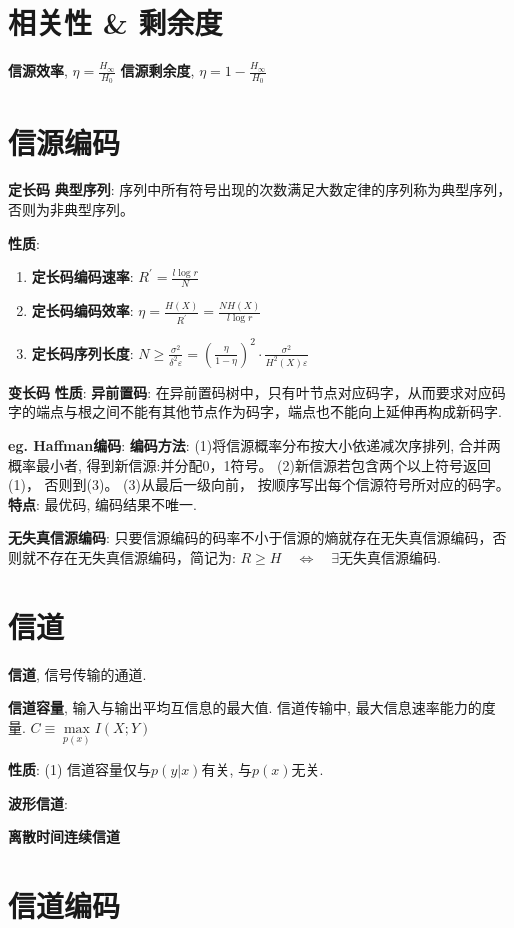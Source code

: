 \documentclass{article}
\newcommand{\env}[2]{\begin{#1}#2\end{#1}}
\newcommand{\defi}[2]{\textbf{#1}, #2}
\begin{document}
    \section{相关性 \& 剩余度}
        \defi{信源效率}{$\eta = \frac{H_\infty}{H_0}$}
        \defi{信源剩余度}{$\eta = 1 - \frac{H_\infty}{H_0}$}
            
    \section{信源编码}
        \textbf{定长码}
            \textbf{典型序列}: 序列中所有符号出现的次数满足大数定律的序列称为典型序列，否则为非典型序列。

            \textbf{性质}:
                \env{enumerate}{
                \item \textbf{定长码编码速率}: $R^{\prime}=\frac{l \log r}{N}$
                \item \textbf{定长码编码效率}: $\eta=\frac{H(X)}{R^{\prime}}=\frac{N H(X)}{l \log r}$
                \item \textbf{定长码序列长度}: $N \geqslant \frac{\sigma^{2}}{\delta^{2} \varepsilon}=\left(\frac{\eta}{1-\eta}\right)^{2} \cdot \frac{\sigma^{2}}{H^{2}(X) \varepsilon}$
                }


        \textbf{变长码}  
            \textbf{性质}:
                \textbf{异前置码}: 在异前置码树中，只有叶节点对应码字，从而要求对应码字的端点与根之间不能有其他节点作为码字，端点也不能向上延伸再构成新码字.
                

            \textbf{eg. Haffman编码}:
                \textbf{编码方法}:
                    (1)将信源概率分布按大小依递减次序排列, 合并两概率最小者, 得到新信源:并分配0，1符号。
                    (2)新信源若包含两个以上符号返回(1)， 否则到(3)。
                    (3)从最后一级向前， 按顺序写出每个信源符号所对应的码字。
                \textbf{特点}:
                    最优码, 编码结果不唯一.
                    
        \textbf{无失真信源编码}: 只要信源编码的码率不小于信源的熵就存在无失真信源编码，否则就不存在无失真信源编码，简记为: $ R \ge H \quad \Leftrightarrow  \quad \exists \text{无失真信源编码}$.
        

\section{信道}
    \defi{信道}{信号传输的通道.}

    \defi{信道容量}{输入与输出平均互信息的最大值. 信道传输中, 最大信息速率能力的度量. $C \equiv \max\limits_{p(x)} I(X ; Y)$}
    
        \textbf{性质}:
            (1) 信道容量仅与$p(y|x)$有关, 与$p(x)$无关.

    \textbf{波形信道}: 

    \textbf{离散时间连续信道}


    \section{信道编码}
        
\end{document}
